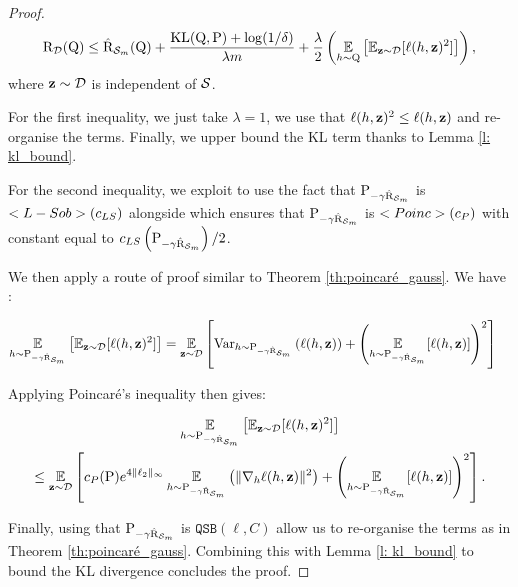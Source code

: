 \begin{noaddcontents}
\begin{proof}
      \begin{align*}
        \Risk_{\D}(\Q) \leq  \hat{\Risk}_{\S_m}(\Q) + \frac{\KL(\Q,\P) +\log(1/\delta)}{\lambda m} 
        + \frac{\lambda }{2}\left(   \EE_{h\sim \Q}\left[\mathbb{E}_{\z\sim \D}[\ell (h,\z)^2]  \right]  \right),
      \end{align*} 
      where $\z\sim \D$ is independent of $\S$.
    
      For the first inequality, we just take $\lambda =1$, we use that $\ell(h,\z)^2 \leq \ell(h,\z)$ and re-organise the terms. Finally, we upper bound the KL term thanks to Lemma \ref{l: kl_bound}.
    
      For the second inequality, we exploit  to use the fact that $\P_{-\gamma \hat{\Risk}_{\S_m}}$ is $\Lsob(c_{LS})$ alongside  which ensures that $\P_{-\gamma \hat{\Risk}_{\S_m}}$ is $\Poinc(c_P)$ with constant equal to $c_{LS}\LP \P_{-\gamma \hat{\Risk}_{\S_m}}\RP/2$.
    
      We then apply a route of proof similar to Theorem \ref{th:poincaré_gauss}. We have : 
    
      \begin{align*}
        \EE_{h\sim \P_{-\gamma \hat{\Risk}_{\S_m}}}\left[\mathbb{E}_{\z\sim \D}[\ell (h,\z)^2] \right] &  = \EE_{\z\sim\D} \LB \Var_{h\sim \P_{-\gamma \hat{\Risk}_{\S_m}}}\LP \ell(h,\z) \RP + \LP \EE_{h\sim\P_{-\gamma \hat{\Risk}_{\S_m}}}[\ell(h,\z)] \RP^2 \RB
      \end{align*}

      Applying Poincaré's inequality then gives:

      \begin{multline*}
        \EE_{h\sim \P_{-\gamma \hat{\Risk}_{\S_m}}}\left[\mathbb{E}_{\z\sim \D}[\ell (h,\z)^2] \right] \\ \leq  \EE_{\z\sim\D} \LB c_P(\P)e^{4\|\ell_2\|_{\infty}}\EE_{h\sim \P_{-\gamma \hat{\Risk}_{\S_m}}}\LP \|\nabla_h \ell(h,\z)\|^2 \RP + \LP \EE_{h\sim\P_{-\gamma \hat{\Risk}_{\S_m}}}[\ell(h,\z)] \RP^2 \RB  .
      \end{multline*}

    
      Finally, using that $\P_{-\gamma \hat{\Risk}_{\S_m}}$ is $\texttt{QSB}(\ell,C)$ allow us to re-organise the terms as in Theorem \ref{th:poincaré_gauss}. Combining this with Lemma \ref{l: kl_bound} to bound the KL divergence concludes the proof.
      
      
    \end{proof}
    

\end{noaddcontents}
